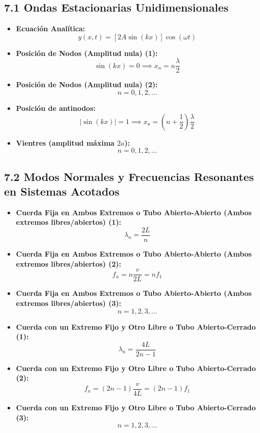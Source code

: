 \documentclass[11pt,a4paper]{article}
\begin{document}
\subsection*{7.1 Ondas Estacionarias Unidimensionales}

\begin{itemize}
  \item \textbf{Ecuación Analítica:}
  \[
    y(x, t) = [2A \sin(kx)] \cos(\omega t)
  \]
  \item \textbf{Posición de Nodos (Amplitud nula) (1):}
  \[
    \sin(kx) = 0 \implies x_n = n \frac{\lambda}{2}
  \]
  \item \textbf{Posición de Nodos (Amplitud nula) (2):}
  \[
    n = 0, 1, 2, \dots
  \]
  \item \textbf{Posición de antinodos:}
  \[
    |\sin(kx)| = 1 \implies x_a = \left( n + \frac{1}{2} \right) \frac{\lambda}{2}
  \]
  \item \textbf{Vientres (amplitud máxima $2a$):}
  \[
    n = 0, 1, 2, \dots
  \]
\end{itemize}

\subsection*{7.2 Modos Normales y Frecuencias Resonantes en Sistemas Acotados}

\begin{itemize}
  \item \textbf{Cuerda Fija en Ambos Extremos o Tubo Abierto-Abierto (Ambos extremos libres/abiertos) (1):}
  \[
    \lambda_n = \frac{2L}{n}
  \]
  \item \textbf{Cuerda Fija en Ambos Extremos o Tubo Abierto-Abierto (Ambos extremos libres/abiertos) (2):}
  \[
    f_n = n \frac{v}{2L} = n f_1
  \]
  \item \textbf{Cuerda Fija en Ambos Extremos o Tubo Abierto-Abierto (Ambos extremos libres/abiertos) (3):}
  \[
    n = 1, 2, 3, \dots
  \]
  \item \textbf{Cuerda con un Extremo Fijo y Otro Libre o Tubo Abierto-Cerrado (1):}
  \[
    \lambda_n = \frac{4L}{2n - 1}
  \]
  \item \textbf{Cuerda con un Extremo Fijo y Otro Libre o Tubo Abierto-Cerrado (2):}
  \[
    f_n = (2n - 1) \frac{v}{4L} = (2n - 1) f_1
  \]
  \item \textbf{Cuerda con un Extremo Fijo y Otro Libre o Tubo Abierto-Cerrado (3):}
  \[
    n = 1, 2, 3, \dots
  \]
\end{itemize}
\end{document}
